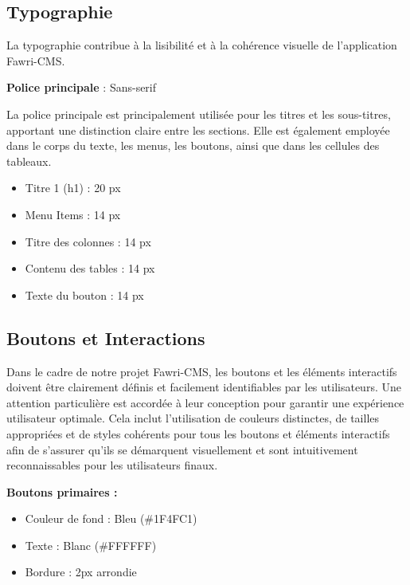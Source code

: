 \subsection{Typographie}
\hspace{\parindent}La typographie contribue à la lisibilité et à la cohérence visuelle de l'application Fawri-CMS.

\textbf{Police principale} : Sans-serif

La police principale est principalement utilisée pour les titres et les sous-titres, apportant une distinction claire entre les sections. Elle est également employée dans le corps du texte, les menus, les boutons, ainsi que dans les cellules des tableaux.

\begin{itemize}
  \item Titre 1 (h1) : 20 px

  \item Menu Items : 14 px

  \item Titre des colonnes : 14 px

  \item Contenu des tables : 14 px

  \item Texte du bouton : 14 px
\end{itemize}










\subsection{Boutons et Interactions}
\hspace{\parindent}Dans le cadre de notre projet Fawri-CMS, les boutons et les éléments interactifs doivent être clairement définis et facilement identifiables par les utilisateurs. Une attention particulière est accordée à leur conception pour garantir une expérience utilisateur optimale. Cela inclut l'utilisation de couleurs distinctes, de tailles appropriées et de styles cohérents pour tous les boutons et éléments interactifs afin de s'assurer qu'ils se démarquent visuellement et sont intuitivement reconnaissables pour les utilisateurs finaux.

\textbf{Boutons primaires :}
\begin{itemize}
  \item Couleur de fond : Bleu (\#1F4FC1)

  \item Texte : Blanc (\#FFFFFF)

  \item Bordure : 2px arrondie
\end{itemize}

